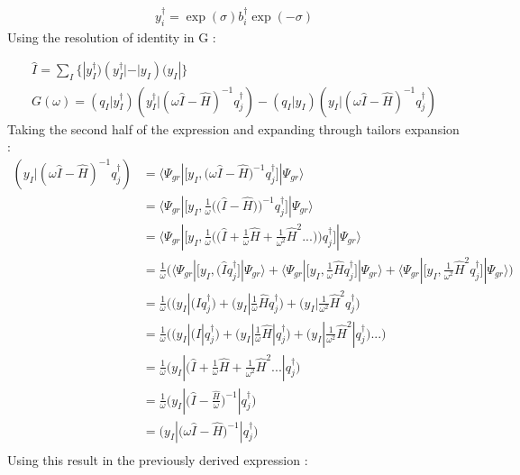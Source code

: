 \documentclass[11pt, oneside]{article}   	%
\begin{document}
\begin{equation*}\label{eq:unitary transformed excitation}
  \begin{aligned}
    y_i^\dagger=\exp(\sigma) b_i^\dagger \exp(- \sigma)
  \end{aligned}
\end{equation*}
Using the resolution of identity in G :

\begin{equation*}\label{eq:resolution of identity}
  \begin{aligned}
    \hat I=\sum_I \{ |y_I^\dagger)(y_I^\dagger|-|y_I)(y_I|\}\\
    G(\omega)=(q_I|y_I^\dagger)(y_I^\dagger|(\omega \hat I - \hat H)^{-1}q_j^\dagger) - (q_I|y_I)(y_I|(\omega \hat I - \hat H)^{-1}q_j^\dagger)
  \end{aligned}
\end{equation*}
Taking the second half of the expression and expanding through tailors expansion :
\begin{equation*}\label{eq:resolution of identity}
  \begin{aligned}
    (y_I|(\omega \hat I - \hat H)^{-1}q_j^\dagger) &=\big \langle \Psi_{gr} |\big[ y_I , \big(\omega \hat I-\hat H \big)^{-1} q_j^\dagger \big] | \Psi_{gr}\big \rangle \\ 
     &=\big \langle \Psi_{gr} |\big[ y_I , \frac{1}{ \omega} \Bigg( \big( \hat I-\hat H \big)\Bigg)^{-1} q_j^\dagger \big] | \Psi_{gr}\big \rangle \\ 
     &=\big \langle \Psi_{gr} |\big[ y_I , \frac{1}{\omega} \Bigg( \big( \hat I+ \frac{1}{ \omega} \hat H + \frac{1}{\omega^2}\hat H^2 ...\big)\Bigg) q_j^\dagger \big] | \Psi_{gr}\big \rangle \\ 
     &=\frac{1}{\omega }\Bigg(\big \langle \Psi_{gr} |\big[ y_I , \big( \hat I q_j^\dagger \big] | \Psi_{gr}\big \rangle +\big \langle \Psi_{gr} |\big[ y_I , \frac{1}{\omega}\hat H  q_j^\dagger \big] | \Psi_{gr}\big \rangle  +\big \langle \Psi_{gr} |\big[ y_I ,\frac{1}{\omega^2} \hat H^2  q_j^\dagger \big] | \Psi_{gr}\big \rangle \Bigg)\\ 
     &=\frac{1}{\omega} \Bigg(\big( y_I | \big( \hat I q_j^\dagger \big) +\big( y_I | \frac{1}{\omega}\hat H  q_j^\dagger \big) +\big( y_I |\frac{1}{\omega^2} \hat H^2  q_j^\dagger \big)\\ 
     &=\frac{1}{\omega} \Bigg(\big( y_I | \big( \hat I| q_j^\dagger \big) +\big( y_I | \frac{1}{\omega}\hat H | q_j^\dagger \big) +\big( y_I |\frac{1}{\omega^2} \hat H^2|  q_j^\dagger \big)...\Bigg)\\ 
     &=\frac{1}{\omega} \big( y_I | \big( \hat I + \frac{1}{\omega}\hat H + \frac{1}{\omega^2} \hat H^2 ...|  q_j^\dagger \big)\\ 
     &=\frac{1}{\omega} \big( y_I | \big( \hat I - \frac{\hat H}{\omega}\big)^{-1}|  q_j^\dagger \big)\\ 
     &= \big( y_I | \big( \omega\hat I - \hat H\big)^{-1}|  q_j^\dagger \big)\\ 
  \end{aligned}
\end{equation*}
Using this result in the previously derived expression :
\end{document}

